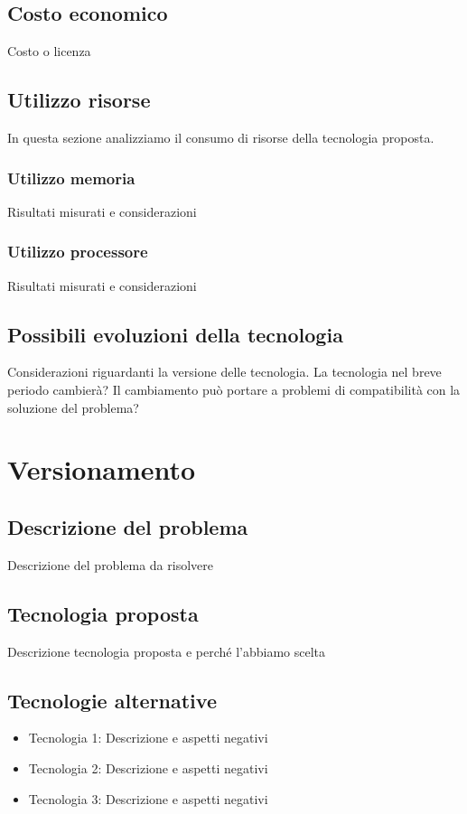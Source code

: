 \documentclass[./../Technology Baseline.tex]{subfiles}
\begin{document}
\subsection{Costo economico}
Costo o licenza
\subsection{Utilizzo risorse}
In questa sezione analizziamo il consumo di risorse della tecnologia proposta.
\subsubsection{Utilizzo memoria}
Risultati misurati e considerazioni
\subsubsection{Utilizzo processore}
Risultati misurati e considerazioni
\subsection{Possibili evoluzioni della tecnologia}
Considerazioni riguardanti la versione delle tecnologia.
La tecnologia nel breve periodo cambierà? Il cambiamento può portare a problemi di compatibilità con la soluzione del problema?

\section{Versionamento}

\subsection{Descrizione del problema}
Descrizione del problema da risolvere

\subsection{Tecnologia proposta}
Descrizione tecnologia proposta e perché l'abbiamo scelta

\subsection{Tecnologie alternative}
\begin{itemize}
	\item{Tecnologia 1:} Descrizione e aspetti negativi
	\item{Tecnologia 2:} Descrizione e aspetti negativi
	\item{Tecnologia 3:} Descrizione e aspetti negativi
\end{itemize}
\end{document}
